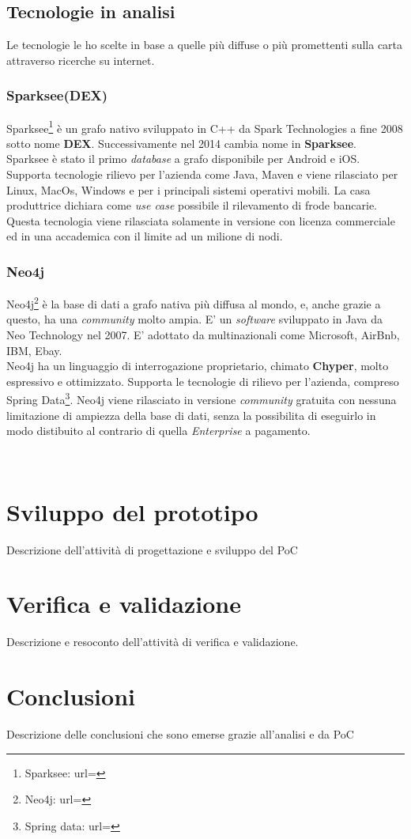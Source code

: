 \subsection{Tecnologie in analisi}
Le tecnologie le ho scelte in base a quelle più diffuse o più promettenti sulla carta attraverso ricerche su internet.

\subsubsection{Sparksee(DEX)}
Sparksee\footnote{Sparksee: url= } è un grafo nativo sviluppato in C++ da Spark Technologies a fine 2008 sotto nome \textbf{DEX}. Successivamente nel 2014 cambia nome in \textbf{Sparksee}.\\
Sparksee è stato il primo \textit{database} a grafo disponibile per Android e iOS.\\
Supporta tecnologie rilievo per l'azienda come Java, Maven e viene rilasciato per Linux, MacOs, Windows e per i principali sistemi operativi mobili.
La casa produttrice dichiara come \textit{use case} possibile il rilevamento di frode bancarie.\\
Questa tecnologia viene rilasciata solamente in versione con licenza commerciale ed in una accademica con il limite ad un milione di nodi.

\subsubsection{Neo4j}
Neo4j\footnote{Neo4j: url= } è la base di dati a grafo nativa più diffusa al mondo, e, anche grazie a questo, ha una \textit{community} molto ampia. E' un \textit{software} sviluppato in Java da Neo Technology nel 2007. E' adottato da multinazionali come Microsoft, AirBnb, IBM, Ebay.\\
Neo4j ha un linguaggio di interrogazione proprietario, chimato \textbf{Chyper}, molto espressivo e ottimizzato. Supporta le tecnologie di rilievo per l'azienda, compreso Spring Data\footnote{Spring data: url= }. Neo4j viene rilasciato in versione \textit{community} gratuita con nessuna limitazione di ampiezza della base di dati, senza la possibilita di eseguirlo in modo distibuito al contrario di quella \textit{Enterprise} a pagamento.

\









\section{Sviluppo del prototipo}

Descrizione dell'attività di progettazione e sviluppo del PoC

\section{Verifica e validazione}
Descrizione e resoconto dell'attività di verifica e validazione.

\section{Conclusioni}

Descrizione delle conclusioni che sono emerse grazie all'analisi e da PoC

